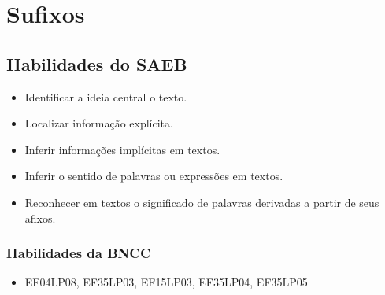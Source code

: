 \chapter{Sufixos}


\section*{Habilidades do SAEB}

\begin{itemize}
\item Identificar a ideia central o texto.

\item Localizar informação explícita.

\item Inferir informações implícitas em textos.

\item Inferir o sentido de palavras ou expressões em textos.

\item Reconhecer em textos o significado de palavras derivadas a partir de seus afixos.
\end{itemize}

\subsection{Habilidades da BNCC}

\begin{itemize}
	\item 
EF04LP08, EF35LP03, EF15LP03, EF35LP04, EF35LP05
\end{itemize}

